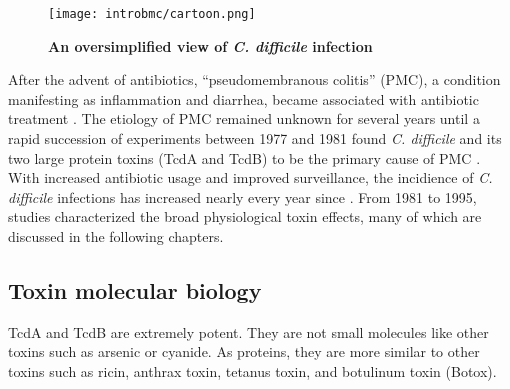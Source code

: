 \begin{figure}[b!]
  \centering
  \texttt{[image: introbmc/cartoon.png]}
  \caption[An oversimplified view of \textit{C. difficile} infection]
  {\textbf{An oversimplified view of \textit{C. difficile} infection}}
  \label{introbmc:cartoon}
\end{figure}

After the advent of antibiotics, ``pseudomembranous colitis'' (PMC), a condition
manifesting as inflammation and diarrhea, became associated
with antibiotic treatment \cite{Tedesco:1974jo,Bartlett:2008jx}. 
The etiology of PMC remained unknown
for several years until a rapid succession of experiments between 1977 and 1981
found \textit{C. difficile} and its two large protein toxins (TcdA and TcdB)
 to be the primary cause of PMC 
\cite{Lusk:1978ub,Chang:1978um,Browne:1977ui,Fekety:1979ul,
Ebright:1981uj,Taylor:1981uda,Bartlett:1978tj,Bartlett:1977wra,
Lusk:1977wg,MRKeighley:1978ku}. 
With increased antibiotic usage and improved surveillance,
the incidience of \textit{C. difficile} infections has increased 
nearly every year since \cite{Lucado:2012wl}.
From 1981 to 1995, 
studies characterized the broad physiological toxin effects,
many of which are discussed in the following chapters.


\subsection{Toxin molecular biology}\label{toxmolecbio}
TcdA and TcdB are extremely potent.
They are not small molecules like other toxins such as 
arsenic or cyanide.
As proteins, they are more similar to other toxins such as 
ricin, anthrax toxin,
tetanus toxin, and botulinum toxin (Botox).

